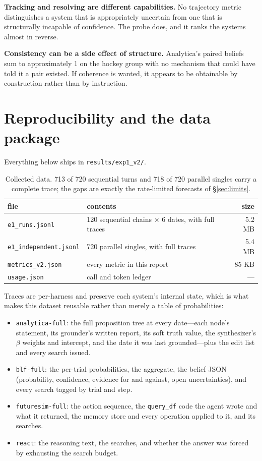 \documentclass[10pt]{article}
\newcommand{\hr}[1]{\texttt{#1}}
\begin{document}
\textbf{Tracking and resolving are different capabilities.} No trajectory metric distinguishes a
system that is appropriately uncertain from one that is structurally incapable of confidence. The
probe does, and it ranks the systems almost in reverse.

\textbf{Consistency can be a side effect of structure.} Analytica's paired beliefs sum to
approximately 1 on the hockey group with no mechanism that could have told it a pair existed. If
coherence is wanted, it appears to be obtainable by construction rather than by instruction.

\section{Reproducibility and the data package}\label{sec:data}
Everything below ships in \texttt{results/exp1\_v2/}.

\begin{table}[htbp]\centering\small
\begin{tabular}{@{}llr@{}}
\toprule
file & contents & size \\
\midrule
\texttt{e1\_runs.jsonl} & 120 sequential chains $\times$ 6 dates, with full traces & 5.2 MB \\
\texttt{e1\_independent.jsonl} & 720 parallel singles, with full traces & 5.4 MB \\
\texttt{metrics\_v2.json} & every metric in this report & 85 KB \\
\texttt{usage.json} & call and token ledger & --- \\
\bottomrule
\end{tabular}
\caption{Collected data. 713 of 720 sequential turns and 718 of 720 parallel singles carry a
complete trace; the gaps are exactly the rate-limited forecasts of \S\ref{sec:limits}.}
\label{tab:data}
\end{table}

Traces are per-harness and preserve each system's internal state, which is what makes this dataset
reusable rather than merely a table of probabilities:

\begin{itemize}
\item \hr{analytica-full}: the full proposition tree at every date---each node's statement, its
grounder's written report, its soft truth value, the synthesizer's $\beta$ weights and intercept,
and the date it was last grounded---plus the edit list and every search issued.
\item \hr{blf-full}: the per-trial probabilities, the aggregate, the belief JSON (probability,
confidence, evidence for and against, open uncertainties), and every search tagged by trial and
step.
\item \hr{futuresim-full}: the action sequence, the \texttt{query\_df} code the agent wrote and
what it returned, the memory store and every operation applied to it, and its searches.
\item \hr{react}: the reasoning text, the searches, and whether the answer was forced by exhausting
the search budget.
\end{itemize}
\end{document}
